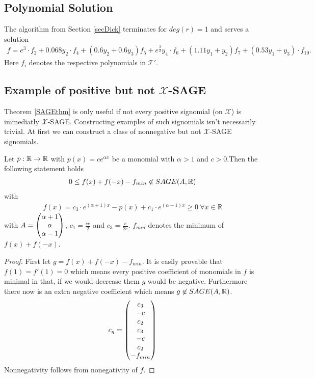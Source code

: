 \documentclass[./main.tex]{subfiles}
\begin{document}
\subsection{Polynomial Solution}
The algorithm from Section \ref{secDick} terminates for $deg(r)=1$ and serves a solution
\begin{align*}
f=e^3 \cdot f_2 +0.068y_2  \cdot f_4 + (0.6y_2 +0.6y_3) f_5 + e^{\frac{3}{2}} y_4 \cdot f_6 + (1.11 y_1 +y_2) f_7 +(0.53 y_1 +y_3) \cdot f_{10}.
\end{align*}
Here $f_i$ denotes the respective polynomials in $\mathcal{T}'$.







\subsection{Example of positive but not $\mathcal{X}$-SAGE}
Theorem \ref{SAGEthm} is only useful if not every positive signomial (on $\mathcal{X}$) is immediatly $\mathcal{X}$-SAGE. Constructing examples of such signomials isn't necessarily trivial. At first we can construct a class of nonnegative but not $\mathcal{X}$-SAGE signomials.
\begin{thm}
\label{monomClass}
Let $p: \mathbb{R} \rightarrow \mathbb{R}$ with $p(x) = c e^{\alpha x}$ be a monomial with $\alpha >1$ and $c>0$.Then the following statement holds
\begin{align*}
0 \leq f(x)+f(-x)-f_{min} \not\in SAGE(A,\mathbb{R})
\end{align*}
with
\begin{align*}
f(x) = c_3 \cdot e^{(\alpha +1) x} -p(x) + c_1 \cdot e^{(\alpha -1) x} \geq 0 \ \forall x \in \mathbb{R}
\end{align*}
with $A = \begin{pmatrix}\alpha +1 \\ \alpha \\ \alpha -1 \end{pmatrix}$, $c_1 = \frac {c e} {2} $ and $c_3 = \frac {c} {2 e}$. $f_{min}$ denotes the minimum of $f(x)+f(-x)$.
\begin{proof} First let $g=f(x)+f(-x)-f_{min}$. It is easily provable that  $f(1)=f'(1)=0$ which means every positive coefficient of monomials in $f$ is minimal in that, if we would decrease them $g$ would be negative. Furthermore there now is an extra negative coefficient which means $g\not \in SAGE(A,\mathbb{R})$. 
\begin{align*}
c_g=\begin{pmatrix}c_3\\-c\\c_2\\c_3\\-c\\c_2\\-f_{min}\end{pmatrix}
\end{align*}
Nonnegativity follows from nonegativity of $f$.
\end{proof}
\end{thm}
\end{document}
